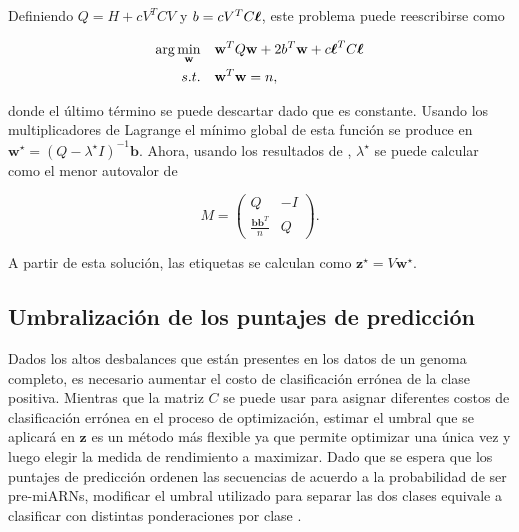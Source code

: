 \noindent Definiendo $ Q = H + c V ^ T C V $ y $ b = c V ^ T C \boldsymbol\ell $, este problema puede reescribirse como

\begin{equation}
	\begin{split}
		\arg\min_{\mathbf{w}} &\quad \mathbf{w}^T Q \mathbf{w} + 2 b^T \mathbf{w} + c \boldsymbol\ell^T C \boldsymbol\ell \\
		s.t. &\quad \mathbf{w}^T \mathbf{w} = n,
	\end{split}
\end{equation}

\noindent donde el último término se puede descartar dado que es constante. Usando los multiplicadores de Lagrange el mínimo global de esta función se produce
en $\mathbf {w}^\star = (Q - \lambda^\star I)^{- 1} \mathbf{b} $. Ahora, usando los resultados de \cite{gander1989contrained}, $ \lambda^\star$ se puede
calcular como el menor autovalor de

\begin{equation}
	M = \left( \begin{array}{cc}
			Q & -I \\
	\frac{{\mathbf{b} \mathbf{b}^T}}{{n}} & Q \end{array} \right).
\end{equation}

\noindent A partir de esta solución, las etiquetas se calculan como $ \mathbf {z} ^ \star = V \mathbf {w} ^ \star $.

\subsection{Umbralización de los puntajes de predicción}

Dados los altos desbalances que están presentes en los datos de un genoma completo, es necesario aumentar el costo de clasificación errónea de la clase
positiva. Mientras que la matriz $C$ se puede usar para asignar diferentes costos de clasificación errónea en el proceso de optimización, estimar el umbral que
se aplicará en $\mathbf{z}$ es un método más flexible ya que permite optimizar una única vez y luego elegir la medida de rendimiento a maximizar. Dado que se
espera que los puntajes de predicción ordenen las secuencias de acuerdo a la probabilidad de ser pre-miARNs, modificar el umbral utilizado para separar las dos
clases equivale a clasificar con distintas ponderaciones por clase \citep{mease2007boosted}.

